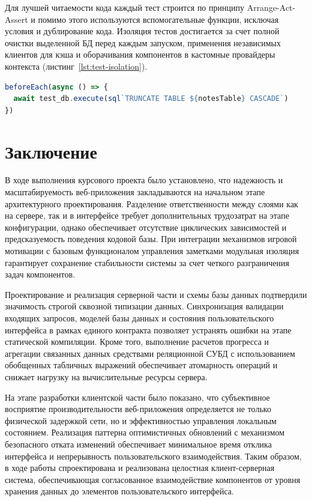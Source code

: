 \documentclass[a4paper,14pt]{extreport}
\begin{document}
Для лучшей читаемости кода каждый тест строится по принципу Arrange-Act-Assert и помимо этого используются вспомогательные функции, исключая условия и дублирование кода. Изоляция тестов достигается за счет полной очистки выделенной БД перед каждым запуском, применения независимых клиентов для кэша и оборачивания компонентов в кастомные провайдеры контекста (листинг~\ref{lst:test-isolation}).

\begin{lstlisting}[language=TypeScript, caption={Изоляция тестовых наборов через очистку таблиц базы данных}, label={lst:test-isolation}]
beforeEach(async () => {
  await test_db.execute(sql`TRUNCATE TABLE ${notesTable} CASCADE`)
})
\end{lstlisting}

\newpage

\chapter*{Заключение}

В ходе выполнения курсового проекта было установлено, что надежность и масштабируемость веб-приложения закладываются на начальном этапе архитектурного проектирования. Разделение ответственности между слоями как на сервере, так и в интерфейсе требует дополнительных трудозатрат на этапе конфигурации, однако обеспечивает отсутствие циклических зависимостей и предсказуемость поведения кодовой базы. При интеграции механизмов игровой мотивации с базовым функционалом управления заметками модульная изоляция гарантирует сохранение стабильности системы за счет четкого разграничения задач компонентов.

Проектирование и реализация серверной части и схемы базы данных подтвердили значимость строгой сквозной типизации данных. Синхронизация валидации входящих запросов, моделей базы данных и состояния пользовательского интерфейса в рамках единого контракта позволяет устранять ошибки на этапе статической компиляции. Кроме того, выполнение расчетов прогресса и агрегации связанных данных средствами реляционной СУБД с использованием обобщенных табличных выражений обеспечивает атомарность операций и снижает нагрузку на вычислительные ресурсы сервера.

На этапе разработки клиентской части было показано, что субъективное восприятие производительности веб-приложения определяется не только физической задержкой сети, но и эффективностью управления локальным состоянием. Реализация паттерна оптимистичных обновлений с механизмом безопасного отката изменений обеспечивает минимальное время отклика интерфейса и непрерывность пользовательского взаимодействия. Таким образом, в ходе работы спроектирована и реализована целостная клиент-серверная система, обеспечивающая согласованное взаимодействие компонентов от уровня хранения данных до элементов пользовательского интерфейса.
\end{document}
